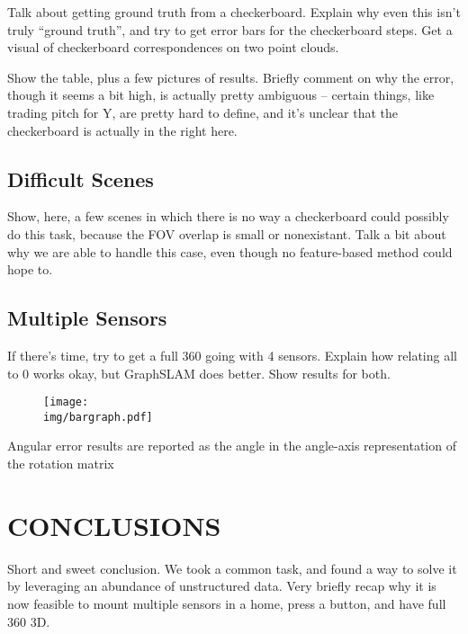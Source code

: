 \documentclass[letterpaper, 10 pt, conference]{ieeeconf}  %
\newcommand{\img}{img}
\begin{document}
Talk about getting ground truth from a checkerboard. Explain why even this isn't truly ``ground truth'', and try to get error bars 
for the checkerboard steps. Get a visual of checkerboard correspondences on two point clouds.

Show the table, plus a few pictures of results. Briefly comment on why the error, though it seems a bit high, is actually pretty ambiguous -- certain things, like trading pitch for Y, are pretty hard to define, and it's unclear that the checkerboard is actually in the 
right here. 

\subsection{Difficult Scenes}

Show, here, a few scenes in which there is no way a checkerboard could possibly do this task, because the FOV overlap is small or 
nonexistant. Talk a bit about why we are able to handle this case, even though no feature-based method could hope to.

\subsection{Multiple Sensors}

If there's time, try to get a full 360 going with 4 sensors. Explain how relating all to 0 works okay, but GraphSLAM does better. Show 
results for both.

\begin{figure}
  \centering
  \texttt{[image: \\img/bargraph.pdf]}
  \caption{}
  \label{fig:bargraph}
\end{figure}

\begin{figure}
  \centering
  
  \label{fig:results}
\end{figure}

Angular error results are reported as the angle in the angle-axis representation of the rotation matrix 

\section{CONCLUSIONS}

Short and sweet conclusion. We took a common task, and found a way to solve it by leveraging an abundance of unstructured 
data. Very briefly recap why it is now feasible to mount multiple sensors in a home, press a button, and have full 360 3D.



\end{document}
